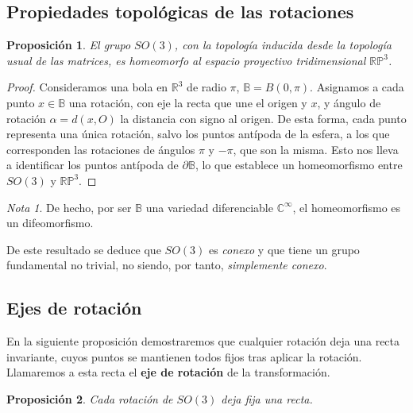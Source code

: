 \documentclass{article}
\theoremstyle{plain}
\newtheorem{proposition}{Proposición}
\theoremstyle{definition}
\theoremstyle{remark}
\newtheorem*{remark}{Nota}
\begin{document}
\subsection{Propiedades topológicas de las rotaciones}
\begin{proposition}
  El grupo $SO(3)$, con la topología inducida desde la topología usual
  de las matrices, es homeomorfo al espacio proyectivo tridimensional
  $\mathbb{RP}^3$.
\end{proposition}
\begin{proof}
  Consideramos una bola en $\mathbb R^3$ de radio $\pi$,
  $\mathbb B = B(0, \pi)$. Asignamos a cada punto $x \in \mathbb B$
  una rotación, con eje la recta que une el origen y $x$, y ángulo de
  rotación $\alpha = d(x, O)$ la distancia con signo al origen. De
  esta forma, cada punto representa una única rotación, salvo los
  puntos antípoda de la esfera, a los que corresponden las rotaciones de ángulos
  $\pi$ y $-\pi$, que son la misma. Esto nos lleva a identificar los
  puntos antípoda de $\partial \mathbb B$, lo que establece un
  homeomorfismo entre $SO(3)$ y $\mathbb{RP}^3$.
\end{proof}

\begin{remark}
  De hecho, por ser $\mathbb B$ una variedad diferenciable
  $\mathbb{C^{\infty}}$, el homeomorfismo es un difeomorfismo.
\end{remark}

De este resultado se deduce que $SO(3)$ es \textit{conexo} y que tiene un grupo
fundamental no trivial, no siendo, por tanto, \textit{simplemente conexo}.

\subsection{Ejes de rotación}
En la siguiente proposición demostraremos que cualquier rotación deja
una recta invariante, cuyos puntos se mantienen todos fijos tras
aplicar la rotación. Llamaremos a esta recta el \textbf{eje de rotación}
de la transformación.

\begin{proposition}
  Cada rotación de $SO(3)$ deja fija una recta.
\end{proposition}
\end{document}
